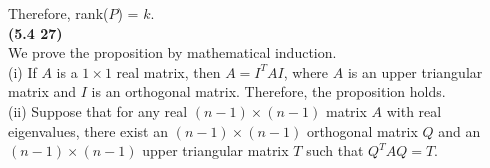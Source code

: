 Therefore, rank($P$) = $k$. \\

\textbf{(5.4 27)} \\
We prove the proposition by mathematical induction. \\

(i) If $A$ is a $1 \times 1$ real matrix, then $A = I^TAI$, where $A$ is an upper triangular matrix and $I$ is an orthogonal matrix. Therefore, the proposition holds. \\

(ii) Suppose that for any real $(n-1) \times (n-1)$ matrix $A$ with real eigenvalues, there exist an $(n-1) \times (n-1)$ orthogonal matrix $Q$ and an  $(n-1) \times (n-1)$ upper triangular matrix $T$ such that $Q^TAQ = T$. \\

